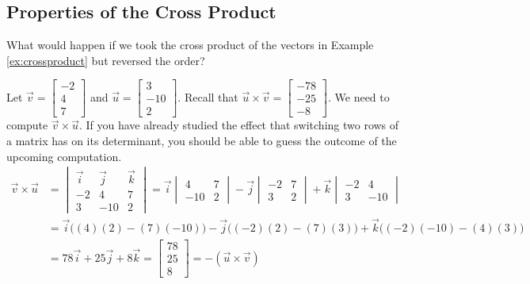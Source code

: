 \documentclass{ximera}
\begin{document}
\subsection*{Properties of the Cross Product}


\begin{exploration}\label{init:crossproduct2}
What would happen if we took the cross product of the vectors in Example \ref{ex:crossproduct} but reversed the order?

Let $\vec{v}=\begin{bmatrix}-2\\ 4\\ 7\end{bmatrix}$ and $\vec{u}=\begin{bmatrix}3\\ -10\\ 2\end{bmatrix}$.
Recall that $\vec{u}\times\vec{v}=\begin{bmatrix}-78\\-25\\-8\end{bmatrix}$.  We need to compute $\vec{v}\times\vec{u}$.  If you have already studied the effect that switching two rows of a matrix has on its determinant, you should be able to guess the outcome of the upcoming computation.
\begin{align*}
\vec{v}\times \vec{u}&=
\begin{vmatrix}
\vec{i} & \vec{j} & \vec{k}\\
-2 &4 &7\\
3 & -10 &2
\end{vmatrix} =\vec{i}
\begin{vmatrix}
4 & 7\\
-10 & 2
\end{vmatrix} -\vec{j}
\begin{vmatrix}
-2 & 7\\
3 & 2
\end{vmatrix} +\vec{k}
\begin{vmatrix}
-2 & 4\\
3 & -10
\end{vmatrix}\\
&=\vec{i}\Big((4)(2)-(7)(-10)\Big)-\vec{j}\Big((-2)(2)-(7)(3)\Big)+\vec{k}\Big((-2)(-10)-(4)(3)\Big)\\
&=78\vec{i}+25\vec{j}+8\vec{k}
=\begin{bmatrix}78\\ 25\\ 8\end{bmatrix}=-(\vec{u}\times\vec{v})
\end{align*}


\end{exploration}
\end{document}
